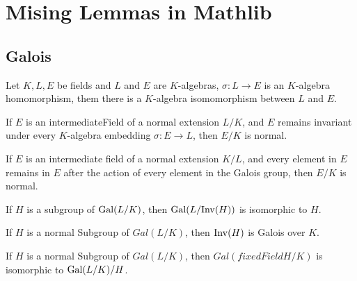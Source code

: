 \chapter{Mising Lemmas in Mathlib}

\section{Galois}

\begin{lemma}
	\leanok
	Let $ K, L, E $ be fields and $ L $ and $ E $ are $ K $-algebras, $\sigma : L \to E $ is an $ K $-algebra homomorphism, them there is a $ K $-algebra isomomorphism between $ L $ and $ E $.
\end{lemma}

\begin{lemma}
	\leanok
	If $E$ is an intermediateField of a normal extension $L / K$, and $E$ remains invariant under every $K$-algebra embedding $\sigma : E \to L$, then $E / K$ is normal.
\end{lemma}

\begin{theorem}
	\leanok
	If $E$ is an intermediate field of a normal extension $K / L$, and every element in $E$ remains in $E$ after the action of every element in the Galois group, then $E / K$ is normal.
\end{theorem}

\begin{theorem}
	\leanok
	If $H$ is a subgroup of $\mathrm{Gal}(L/K)$, then $\mathrm{Gal}(L / \mathrm{Inv} (H))$ is isomorphic to $H$.
\end{theorem}

\begin{theorem}
	\leanok
	If $H$ is a normal Subgroup of $Gal(L/K)$, then $\mathrm{Inv} (H)$ is Galois over $K$.
\end{theorem}

\begin{theorem}
	\leanok
	If $H$ is a normal Subgroup of $Gal(L / K)$, then $Gal(fixedField H / K)$ is isomorphic to $\mathrm{Gal}(L / K) / H$.
\end{theorem}

